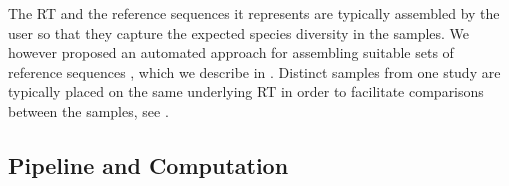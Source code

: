 The \ac{RT} and the reference sequences it represents are typically assembled by the user
so that they capture the expected species diversity in the samples.
We however proposed an automated approach for assembling suitable sets of reference sequences \cite{Czech2018},
which we describe in .
Distinct samples from one study are typically placed on the same underlying \ac{RT}
in order to facilitate comparisons between the samples,
see .




\subsection{Pipeline and Computation}
\label{ch:Foundations:sec:PhylogeneticPlacement:sub:PipelineAndComputation}



